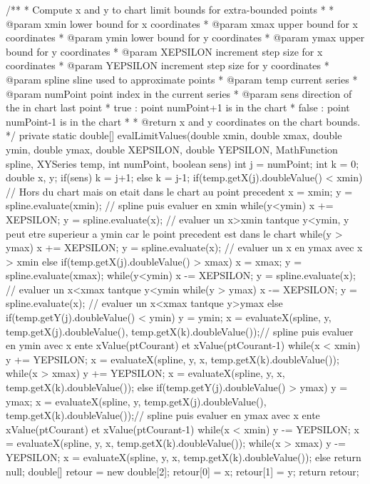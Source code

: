 \begin{code}
\begin{hide}
   /**
    * Compute x and y to chart limit bounds for extra-bounded points
    *
    * @param   xmin     lower bound for x coordinates
    * @param   xmax     upper bound for x coordinates
    * @param   ymin     lower bound for y coordinates
    * @param   ymax     upper bound for y coordinates
    * @param   XEPSILON increment step size for x coordinates
    * @param   YEPSILON increment step size for y coordinates
    * @param   spline   sline used to approximate points
    * @param   temp     current series
    * @param   numPoint point index in the current series
    * @param   sens     direction of the in chart last point
    *                    true  : point numPoint+1 is in the chart
    *                    false : point numPoint-1 is in the chart
    *
    * @return           x and y coordinates on the chart bounds.
    */
   private static double[] evalLimitValues(double xmin, double xmax, double ymin, double ymax, double XEPSILON, double YEPSILON, MathFunction spline, XYSeries temp, int numPoint, boolean sens) {
      int j = numPoint;
      int k = 0;
      double x, y;
      if(sens)
         k = j+1;
      else
         k = j-1;
      if(temp.getX(j).doubleValue() < xmin) {// Hors du chart mais on etait dans le chart au point precedent
         x = xmin;
         y = spline.evaluate(xmin); // spline puis evaluer en xmin
         while(y<ymin) {
            x += XEPSILON;
            y = spline.evaluate(x);
         }  // evaluer un x>xmin tantque y<ymin, y peut etre superieur a ymin car le point precedent est dans le chart
         while(y > ymax) {
            x += XEPSILON;
            y = spline.evaluate(x);
         }  // evaluer un x en ymax avec x > xmin
      }
      else if(temp.getX(j).doubleValue() > xmax) {
         x = xmax;
         y = spline.evaluate(xmax);
         while(y<ymin) {
            x -= XEPSILON;
            y = spline.evaluate(x);
         }  // evaluer un x<xmax tantque y<ymin
         while(y > ymax) {
            x -= XEPSILON;
            y = spline.evaluate(x);
         }  // evaluer un x<xmax tantque y>ymax
      }
      else if(temp.getY(j).doubleValue() < ymin) {
         y = ymin;
         x = evaluateX(spline, y, temp.getX(j).doubleValue(), temp.getX(k).doubleValue());// spline puis evaluer en ymin avec x ente xValue(ptCourant) et xValue(ptCourant-1)
         while(x < xmin) {
            y += YEPSILON;
            x = evaluateX(spline, y, x, temp.getX(k).doubleValue());
         }
         while(x > xmax) {
           y += YEPSILON;
           x = evaluateX(spline, y, x, temp.getX(k).doubleValue());
         }
      }
      else if(temp.getY(j).doubleValue() > ymax) {
         y = ymax;
         x = evaluateX(spline, y, temp.getX(j).doubleValue(), temp.getX(k).doubleValue());// spline puis evaluer en ymax avec x ente xValue(ptCourant) et xValue(ptCourant-1)
         while(x < xmin) {
            y -= YEPSILON;
            x = evaluateX(spline, y, x, temp.getX(k).doubleValue());
         }
         while(x > xmax) {
            y -= YEPSILON;
            x = evaluateX(spline, y, x, temp.getX(k).doubleValue());
         }
      }
      else
         return null;
      double[] retour = new double[2];
      retour[0] = x;
      retour[1] = y;
      return retour;
   }



\end{hide}
\end{code}
